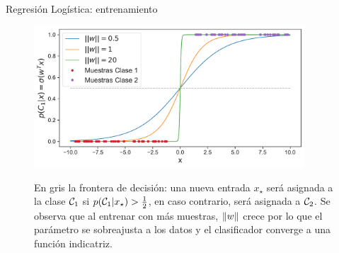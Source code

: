 \documentclass[9pt, handout]{beamer}
\begin{document}
\begin{frame}{Regresión Logística: entrenamiento}
\begin{figure}[H]
  \centering
  \includegraphics[width=0.9\textwidth]{../img/cap3_logistica.pdf}\\
  \label{fig:log_reg}
  \caption{En gris la frontera de decisión: una nueva entrada $x_\star$ será asignada a la clase ${\mathcal C}_1$ si $p({\mathcal C}_1|x_\star)>\frac{1}{2}$, en caso contrario, será asignada a ${\mathcal C}_2$. Se observa que al entrenar con más muestras, $\left\lVert w\right\rVert$ crece por lo que el parámetro se sobreajusta a los datos y el clasificador converge a una función indicatriz.}

\end{figure}


\end{frame}

\begin{frame}
  \titlepage
\end{frame}



%
\end{document}
